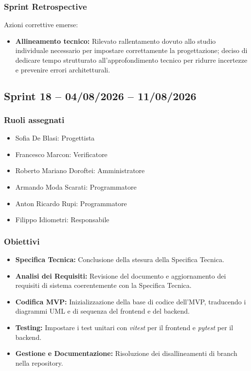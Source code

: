 \subsubsection{Sprint Retrospective}
Azioni correttive emerse:
\begin{itemize}
    \item \textbf{Allineamento tecnico:} Rilevato rallentamento dovuto allo studio individuale necessario per impostare correttamente la progettazione; deciso di dedicare tempo strutturato all’approfondimento tecnico per ridurre incertezze e prevenire errori architetturali.
\end{itemize}

\subsection{Sprint 18 -- 04/08/2026 -- 11/08/2026}
\label{sec:sprint18}

\subsubsection{Ruoli assegnati}
\begin{itemize}
    \item Sofia De Blasi: Progettista
    \item Francesco Marcon: Verificatore
    \item Roberto Mariano Doroftei: Amministratore
    \item Armando Moda Scarati: Programmatore
    \item Anton Ricardo Rupi: Programmatore
    \item Filippo Idiometri: Responsabile
\end{itemize}

\subsubsection{Obiettivi}
\begin{itemize}
    \item \textbf{Specifica Tecnica:} Conclusione della stesura della Specifica Tecnica.
    \item \textbf{Analisi dei Requisiti:} Revisione del documento e aggiornamento dei requisiti di sistema coerentemente con la Specifica Tecnica.
    \item \textbf{Codifica MVP:} Inizializzazione della base di codice dell'MVP, traducendo i diagrammi UML e di sequenza del frontend e del backend.
    \item \textbf{Testing:} Impostare i test unitari con \textit{vitest} per il frontend e \textit{pytest} per il backend.
    \item \textbf{Gestione e Documentazione:} Risoluzione dei disallineamenti di branch nella repository.
\end{itemize}

